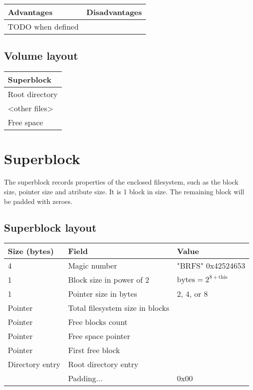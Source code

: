 \documentclass[]{article}
\begin{document}
	\begin{tabularx}{\textwidth}{X|X}
		\textbf{Advantages} & \textbf{Disadvantages} \\
		\hline
		TODO when defined
	\end{tabularx}

	\subsection{Volume layout}

	\begin{tabular}{|l|} 
		\hline
		Superblock \\ 
		\hline	
		Root directory \\
		\hline
		\textless other files\textgreater \\
		\hline
		Free space \\
		\hline
	\end{tabular}

	\section{Superblock}
	
	The superblock records properties of the enclosed filesystem, such as the block size, pointer size and atribute size. It is 1 block in size. The remaining block will be padded with zeroes.
	
	\subsection{Superblock layout}
	
	\begin{tabular}{|l|l|l|} 
		\hline
		\textbf{Size (bytes)} & \textbf{Field} & \textbf{Value} \\ [0.5ex] 
		\hline
		4 & Magic number & "BRFS" 0x42524653  \\ 
		\hline
		1 & Block size in power of 2 & $ \textrm{bytes} = 2^{8 + \textrm{this}}$ \\
		\hline
		1 & Pointer size in bytes & 2, 4, or 8 \\
		\hline
		Pointer & Total filesystem size in blocks & \\
		\hline
		Pointer & Free blocks count & \\
		\hline
		Pointer & Free space pointer & \\
		\hline
		Pointer & First free block & \\
		\hline
		Directory entry & Root directory entry & \\
		\hline
		 & Padding... & 0x00 \\
		\hline	
	\end{tabular}
\end{document}
